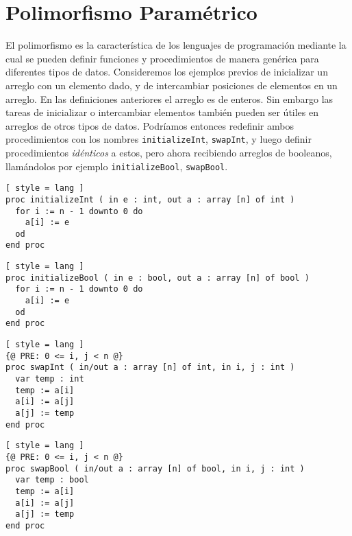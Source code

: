 


\section{Polimorfismo Paramétrico}

El polimorfismo es la característica de los lenguajes de programación mediante la cual se pueden definir funciones y procedimientos de manera genérica para diferentes tipos de datos.
Consideremos los ejemplos previos de inicializar un arreglo con un elemento dado, y de intercambiar posiciones de elementos en un arreglo.
En las definiciones anteriores el arreglo es de enteros.
Sin embargo las tareas de inicializar o intercambiar elementos también pueden ser útiles en arreglos de otros tipos de datos.
Podríamos entonces redefinir ambos procedimientos con los nombres \lstinline[style = lang]{initializeInt}, \lstinline[style = lang]{swapInt}, y luego definir procedimientos \textit{idénticos} a estos, pero ahora recibiendo arreglos de booleanos, llamándolos por ejemplo \lstinline[style = lang]{initializeBool}, \lstinline[style = lang]{swapBool}.

\begin{lstlisting}[ style = lang ]
proc initializeInt ( in e : int, out a : array [n] of int )
  for i := n - 1 downto 0 do
    a[i] := e
  od
end proc
\end{lstlisting}

\begin{lstlisting}[ style = lang ]
proc initializeBool ( in e : bool, out a : array [n] of bool )
  for i := n - 1 downto 0 do
    a[i] := e
  od
end proc
\end{lstlisting}

\begin{lstlisting}[ style = lang ]
{@ PRE: 0 <= i, j < n @}
proc swapInt ( in/out a : array [n] of int, in i, j : int )
  var temp : int
  temp := a[i]
  a[i] := a[j]
  a[j] := temp
end proc
\end{lstlisting}

\begin{lstlisting}[ style = lang ]
{@ PRE: 0 <= i, j < n @}
proc swapBool ( in/out a : array [n] of bool, in i, j : int )
  var temp : bool
  temp := a[i]
  a[i] := a[j]
  a[j] := temp
end proc
\end{lstlisting}

